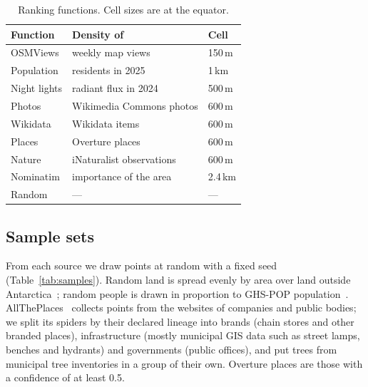 \documentclass[10pt,twocolumn]{article}
\begin{document}
\begin{table}[t]
  \centering\small
  \caption{Ranking functions. Cell sizes are at the equator.}
  \label{tab:functions}
  \begin{tabular}{@{}lll@{}}
    \hline
    Function & Density of & Cell \\
    \hline
    OSMViews & weekly map views & 150\,m \\
    Population & residents in 2025~\cite{ghsl} & 1\,km \\
    Night lights & radiant flux in 2024~\cite{viirs} & 500\,m \\
    Photos & Wikimedia Commons photos & 600\,m \\
    Wikidata & Wikidata items & 600\,m \\
    Places & Overture places~\cite{overture} & 600\,m \\
    Nature & iNaturalist observations~\cite{inaturalist} & 600\,m \\
    Nominatim & importance of the area~\cite{nominatim} & 2.4\,km \\
    Random & --- & --- \\
    \hline
  \end{tabular}
\end{table}

\subsection{Sample sets}
From each source we draw \resRankingLandPoints{} points at random with a
fixed seed (Table~\ref{tab:samples}). Random land is spread evenly by area
over land outside Antarctica~\cite{naturalearth}; random people is drawn in
proportion to GHS-POP population~\cite{ghsl}. AllThePlaces~\cite{atp}
collects points from the websites of companies and public bodies; we split
its spiders by their declared lineage into brands (chain stores and other
branded places), infrastructure (mostly municipal GIS data such as street
lamps, benches and hydrants) and governments (public offices), and put
trees from municipal tree inventories in a group of their own. Overture
places are those with a confidence of at least 0.5.
\end{document}
